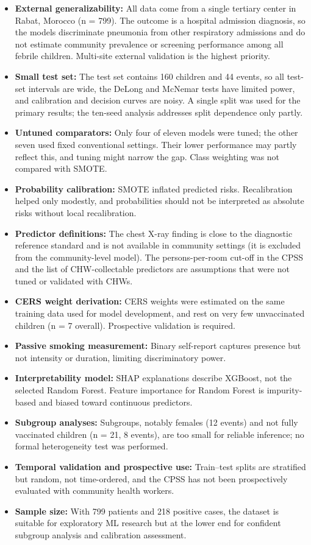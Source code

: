 \documentclass[a4paper,fleqn]{cas-dc}
\begin{document}
\begin{itemize}[leftmargin=1.2em,itemsep=2pt,topsep=3pt]
\item \textbf{External generalizability:} All data come from a single tertiary center in Rabat, Morocco (n = 799). The outcome is a hospital admission diagnosis, so the models discriminate pneumonia from other respiratory admissions and do not estimate community prevalence or screening performance among all febrile children. Multi-site external validation is the highest priority.
\item \textbf{Small test set:} The test set contains 160 children and 44 events, so all test-set intervals are wide, the DeLong and McNemar tests have limited power, and calibration and decision curves are noisy. A single split was used for the primary results; the ten-seed analysis addresses split dependence only partly.
\item \textbf{Untuned comparators:} Only four of eleven models were tuned; the other seven used fixed conventional settings. Their lower performance may partly reflect this, and tuning might narrow the gap. Class weighting was not compared with SMOTE.
\item \textbf{Probability calibration:} SMOTE inflated predicted risks. Recalibration helped only modestly, and probabilities should not be interpreted as absolute risks without local recalibration.
\item \textbf{Predictor definitions:} The chest X-ray finding is close to the diagnostic reference standard and is not available in community settings (it is excluded from the community-level model). The persons-per-room cut-off in the CPSS and the list of CHW-collectable predictors are assumptions that were not tuned or validated with CHWs.
\item \textbf{CERS weight derivation:} CERS weights were estimated on the same training data used for model development, and rest on very few unvaccinated children (n = 7 overall). Prospective validation is required.
\item \textbf{Passive smoking measurement:} Binary self-report captures presence but not intensity or duration, limiting discriminatory power.
\item \textbf{Interpretability model:} SHAP explanations describe XGBoost, not the selected Random Forest. Feature importance for Random Forest is impurity-based and biased toward continuous predictors.
\item \textbf{Subgroup analyses:} Subgroups, notably females (12 events) and not fully vaccinated children (n = 21, 8 events), are too small for reliable inference; no formal heterogeneity test was performed.
\item \textbf{Temporal validation and prospective use:} Train--test splits are stratified but random, not time-ordered, and the CPSS has not been prospectively evaluated with community health workers.
\item \textbf{Sample size:} With 799 patients and 218 positive cases, the dataset is suitable for exploratory ML research but at the lower end for confident subgroup analysis and calibration assessment.
\end{itemize}
\end{document}
